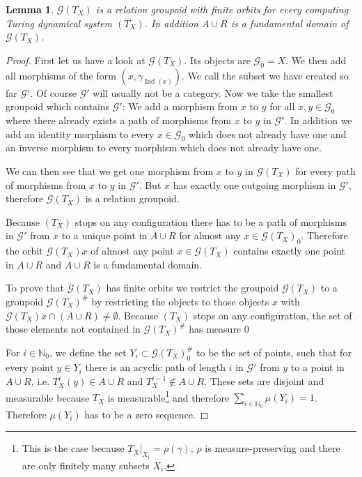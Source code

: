\documentclass[12pt,a4paper]{scrartcl}
\theoremstyle{plain}
\newtheorem{Lemma}[Theorem]{Lemma}
\theoremstyle{definition}
\newcommand{\N}{\mathbb{N}} %
\newcommand{\2}{\mathbb{Z} / 2 \mathbb{Z}}
\newcommand{\G}{\mathcal{G}}
\newcommand{\1}{\bar{1}}
\newcommand{\0}{\bar{0}}
\newcommand{\Ind}{\operatorname{Ind}}
\begin{document}
\begin{Lemma} \label{TX_rel_groupoid}
	$\G (T_X)$ is a relation groupoid with finite orbits for every computing Turing dynamical system $(T_X)$. In addition $A \cup R$ is a fundamental domain of $\G (T_X)$.
\end{Lemma}
\begin{proof}
	First let us have a look at $\G (T_X)$. Its objects are $\G_0 = X$. We then add all morphisms of the form $(x, \gamma_{\Ind(x)})$. We call the subset we have created so far $\G'$. Of course $\G'$ will usually not be a category. Now we take the smallest groupoid which contains $\G'$: We add a morphism from $x$ to $y$ for all $x, y \in \G_0$ where there already exists a path of morphisms from $x$ to $y$ in $\G'$. In addition we add an identity morphism to every $ x\in \G_0$ which does not already have one and an inverse morphism to every morphism which does not already have one. 
	
	We can then see that we get one morphism from $x$ to $y$ in $\G (T_X)$ for every path of morphisms from $x$ to $y$ in $\G'$. But $x$ has exactly one outgoing morphism in $\G'$, therefore $\G (T_X)$ is a relation groupoid.

	Because $(T_X)$ stops on any configuration there has to be a path of morphisms in $\G'$ from $x$ to a unique point in $A \cup R$ for almost any $x \in \G (T_X)_0$. Therefore the orbit $\G (T_X)x$ of almost any point $x \in \G (T_X)$ contains exactly one point in $A \cup R$ and $A \cup R$ is a fundamental domain.
	
	To prove that $\G (T_X)$ has finite orbits we restrict the groupoid $\G (T_X)$ to a groupoid $\G (T_X)^\#$ by restricting the objects to those objects $x$ with $\G (T_X)x \cap (A \cup R) \neq \emptyset$. Because $(T_X)$ stops on any configuration, the set of those elements not contained in $\G (T_X)^\#$ has measure $0$
	
	For $i \in \N_0$, we define the set $Y_i \subset \G (T_X)_0^\#$ to be the set of points, such that for every point $y \in Y_i$ there is an acyclic path of length $i$ in $\G'$ from $y$ to a point in $A \cup R$, i.e. $T_X^i(y) \in A \cup R$ and $T_X^{i-1} \notin A \cup R$. These sets are disjoint and measurable because $T_X$ is measurable\footnote{This is the case because $T_X|_{X_i} = \rho(\gamma)$, $\rho$ is measure-preserving and there are only finitely many subsets $X_i$.} and therefore $\sum_{i \in \N_0} \mu(Y_i) = 1$. Therefore $\mu(Y_i)$ has to be a zero sequence.
	

\end{proof}
\end{document}
